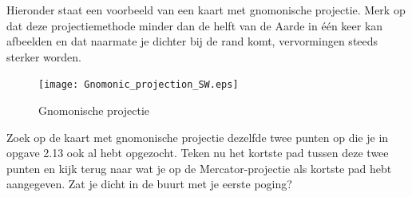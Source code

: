 Hieronder staat een voorbeeld van een kaart met gnomonische projectie. Merk op dat deze projectiemethode minder dan de helft van de Aarde in \'e\'en keer kan afbeelden en dat naarmate je dichter bij de rand komt, vervormingen steeds sterker worden.

\begin{figure}[h]
	\centering
	\texttt{[image: Gnomonic\_projection\_SW.eps]}
	\caption{Gnomonische projectie}
	\label{fig_gnomonic}
\end{figure}

\begin{opgave}
	Zoek op de kaart met gnomonische projectie dezelfde twee punten op die je in opgave 2.13 ook al hebt opgezocht. Teken nu het kortste pad tussen deze twee punten en kijk terug naar wat je op de Mercator-projectie als kortste pad hebt aangegeven. Zat je dicht in de buurt met je eerste poging?
\end{opgave}

\newpage